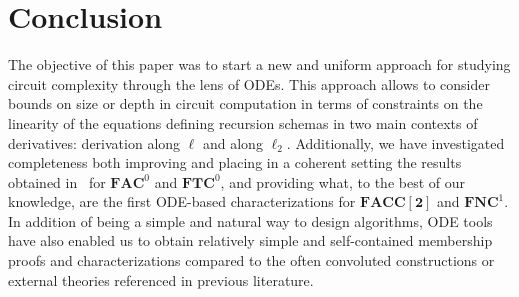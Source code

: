 \documentclass[11pt, oneside]{article}
\newcommand{\NC}{\mathbf{FNC}}
\newcommand{\AC}{\mathbf{FAC}}
\newcommand{\TC}{\mathbf{FTC}}
\newcommand{\FACC}{\mathbf{FACC[2]}}
\theoremstyle{definition}
\begin{document}
\section{Conclusion}\label{sec:conclusion}

The objective of this paper was to start a new and uniform approach for studying circuit complexity through the lens of ODEs.
%
This approach allows to consider bounds on size or depth in circuit computation in terms of constraints on the linearity of the equations defining recursion schemas in two main contexts of derivatives: derivation along $\ell$ and along $\ell_2$.
%
Additionally, we have investigated completeness both improving and placing in a coherent setting the results obtained in~\cite{ADK24a} for $\AC^0$ and $\TC^0$, and providing what, to the best of our knowledge, are the first ODE-based characterizations for $\FACC$ and $\NC^1$.
%
%
%
In addition of being a simple and natural way to design algorithms,  ODE tools have also enabled us to obtain relatively simple and self-contained membership proofs and characterizations compared to the often convoluted constructions or external theories referenced in previous literature.
\end{document}
